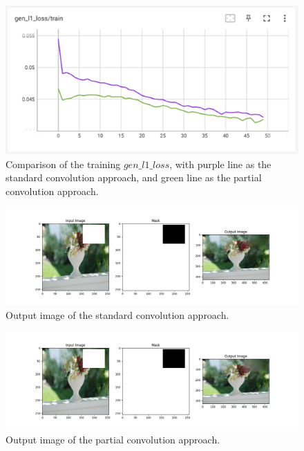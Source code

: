\documentclass[10pt,twocolumn,letterpaper]{article}
\begin{document}
\begin{figure}[t]
    \centering
    \includegraphics[width=\linewidth]{figures/milestone/stand_vs_pconv.png}
    \caption{Comparison of the training $gen\_l1\_loss$, with purple line as the standard convolution approach, and green line as the partial convolution approach.}
    \label{fig:stand_vs_pconv}
\end{figure}

\begin{figure}[t]
    \centering
    \includegraphics[width=\linewidth]{figures/milestone/out_standconv.png}
    \caption{Output image of the standard convolution approach.}
    \label{fig:out_standconv}
\end{figure}

\begin{figure}[t]
    \centering
    \includegraphics[width=\linewidth]{figures/milestone/out_pconv.png}
    \caption{Output image of the partial convolution approach.}
    \label{fig:out_pconv}
\end{figure}

{\small


}
\end{document}

